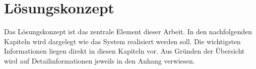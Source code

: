\section{Lösungskonzept}
Das Lösungskonzept ist das zentrale Element dieser Arbeit. In den nachfolgenden Kapiteln wird dargelegt wie das System realisiert werden soll. Die wichtigsten Informationen liegen direkt in diesen Kapiteln vor. Aus Gründen der Übersicht wird auf Detailinformationen jeweils in den Anhang verwiesen.


\newpage

\newpage

\newpage

\newpage

\newpage

\newpage

\newpage

\newpage

\newpage